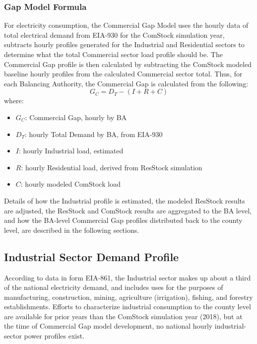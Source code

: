 \subsubsection{Gap Model Formula}
For electricity consumption, the Commercial Gap Model uses the hourly data of total electrical demand from EIA-930 for the ComStock simulation year, subtracts hourly profiles generated for the Industrial and Residential sectors to determine what the total Commercial sector load profile should be. The Commercial Gap profile is then calculated by subtracting the ComStock modeled baseline hourly profiles from the calculated Commercial sector total. Thus, for each Balancing Authority, the Commercial Gap is calculated from the following:
\begin{equation}
G_{C} = D_{T} - (I + R + C)
\end{equation}
where:
\begin{itemize}
    \item $G_{C}$: Commercial Gap, hourly by BA
    \item $D_{T}$: hourly Total Demand by BA, from EIA-930
    \item $I$: hourly Industrial load, estimated
    \item $R$: hourly Residential load, derived from ResStock simulation
    \item $C$: hourly modeled ComStock load
\end{itemize}

Details of how the Industrial profile is estimated, the modeled ResStock results are adjusted, the ResStock and ComStock results are aggregated to the BA level, and how the BA-level Commercial Gap profiles distributed back to the county level, are described in the following sections.

\subsection{Industrial Sector Demand Profile}
According to data in form EIA-861, the Industrial sector makes up about a third of the national electricity demand, and includes uses for the purposes of manufacturing, construction, mining, agriculture (irrigation), fishing, and forestry establishments. Efforts to characterize industrial consumption to the county level are available for prior years than the ComStock simulation year (2018), but at the time of Commercial Gap model development, no national hourly industrial-sector power profiles exist.

